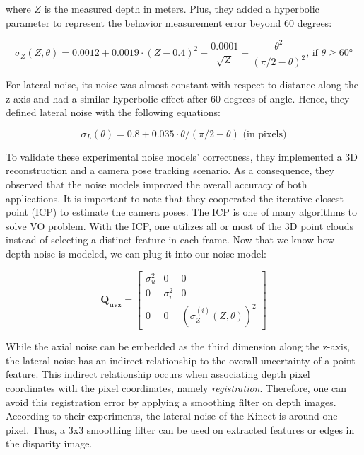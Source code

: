 \documentclass[12pt]{report}
\numberwithin{figure}{section}
\begin{document}
where $Z$ is the measured depth in meters.  Plus, they added a hyperbolic
parameter to represent the behavior measurement error beyond 60 degrees:

\begin{equation} \sigma_Z (Z,\theta) = 0.0012 + 0.0019 \cdot (Z-0.4)^2 +
\frac{0.0001}{\sqrt{Z}} + \frac{\theta^2}{(\pi/2 - \theta)^2} \text{, if }
\theta \geq \ang{60} \end{equation} \label{eq:axial_noise_w_hyperbolic}

For lateral noise, its noise was almost constant with respect to distance along
the z-axis and had a similar hyperbolic effect after 60 degrees of angle.
Hence, they defined lateral noise with the following equations:

\begin{equation} \sigma_L(\theta) = 0.8 + 0.035 \cdot \theta/(\pi/2-\theta)
\text{ (in pixels)} \end{equation}

To validate these experimental noise models' correctness, they implemented a 3D
reconstruction and a camera pose tracking scenario.  As a consequence, they
observed that the noise models improved the overall accuracy of both
applications. It is important to note that they cooperated the iterative
closest point (ICP) to estimate the camera poses. The ICP is one of many
algorithms to solve VO problem.  With the ICP, one utilizes all or most of the
3D point clouds instead of selecting a distinct feature in each frame. Now that
we know how depth noise is modeled, we can plug it into our noise model:

\begin{equation} \mathbf{Q_{uvz}} = \begin{bmatrix} \sigma_u^2 & 0 & 0 \\ 0 &
\sigma_v^2 & 0 \\ 0 & 0 & (\sigma_Z^{(i)}(Z, \theta))^2 \end{bmatrix}
\end{equation}

While the axial noise can be embedded as the third dimension along the z-axis,
the lateral noise has an indirect relationship to the overall uncertainty of a
point feature. This indirect relationship occurs when associating depth pixel
coordinates with the pixel coordinates, namely \textit{registration}.
Therefore, one can avoid this registration error by applying a smoothing filter
on depth images.  According to their experiments, the lateral noise of the
Kinect is around one pixel.  Thus, a 3x3 smoothing filter can be used on
extracted features or edges in the disparity image.
\end{document}

